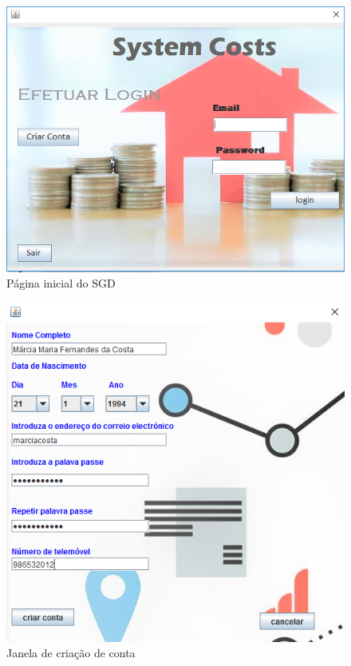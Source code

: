 \begin{figure}[h!]
	\centering
	\includegraphics[scale=0.6]{imagens/interface/inicial}  
	\caption{Página inicial do SGD }  
\end{figure}

\begin{figure}[h!]
	\centering
	\includegraphics[scale=0.6]{imagens/interface/criarconta}  
	\caption{Janela de criação de conta}  
\end{figure}




